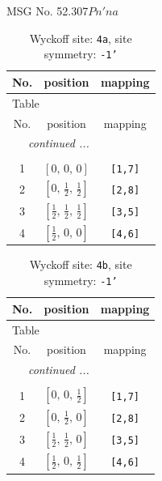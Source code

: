 \documentclass[fleqn,8pt]{jsarticle}
\begin{document}
\setcounter{MaxMatrixCols}{32}

\renewcommand{\tablename}{Table~}
\renewcommand{\figurename}{Figure~}
\begin{center}
\LARGE
MSG No. 52.307\quad$Pn'na$
\end{center}
\renewcommand{\arraystretch}{1.2}
\begin{longtable}{ccc}
\caption{Wyckoff site: {\tt 4a}, site symmetry: {\tt -1'}}
 \\
 \hline \hline
No. & position & mapping \\ \hline \endfirsthead

\multicolumn{2}{l}{\tablename\ \thetable{}} \\
 \hline \hline
No. & position & mapping \\ \hline \endhead

 \hline \hline
\multicolumn{2}{r}{\footnotesize\it continued ...} \\ \endfoot

 \hline \hline
\multicolumn{2}{r}{} \\ \endlastfoot

1 & $\left[ 0,\, 0,\, 0 \right]$ & {\tt [1,7]} \\ \hline
2 & $\left[ 0,\, \frac{1}{2},\, \frac{1}{2} \right]$ & {\tt [2,8]} \\ \hline
3 & $\left[ \frac{1}{2},\, \frac{1}{2},\, \frac{1}{2} \right]$ & {\tt [3,5]} \\ \hline
4 & $\left[ \frac{1}{2},\, 0,\, 0 \right]$ & {\tt [4,6]} \\
\end{longtable}
\renewcommand{\arraystretch}{1.2}
\begin{longtable}{ccc}
\caption{Wyckoff site: {\tt 4b}, site symmetry: {\tt -1'}}
 \\
 \hline \hline
No. & position & mapping \\ \hline \endfirsthead

\multicolumn{2}{l}{\tablename\ \thetable{}} \\
 \hline \hline
No. & position & mapping \\ \hline \endhead

 \hline \hline
\multicolumn{2}{r}{\footnotesize\it continued ...} \\ \endfoot

 \hline \hline
\multicolumn{2}{r}{} \\ \endlastfoot

1 & $\left[ 0,\, 0,\, \frac{1}{2} \right]$ & {\tt [1,7]} \\ \hline
2 & $\left[ 0,\, \frac{1}{2},\, 0 \right]$ & {\tt [2,8]} \\ \hline
3 & $\left[ \frac{1}{2},\, \frac{1}{2},\, 0 \right]$ & {\tt [3,5]} \\ \hline
4 & $\left[ \frac{1}{2},\, 0,\, \frac{1}{2} \right]$ & {\tt [4,6]} \\
\end{longtable}
\end{document}
